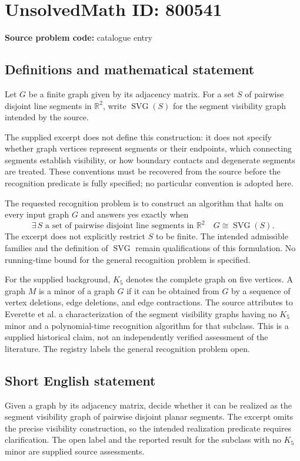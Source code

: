 \documentclass[11pt]{article}
\newcommand{\R}{\mathbb{R}}
\begin{document}
\section*{UnsolvedMath ID: 800541}
\textbf{Source problem code:} catalogue entry
\subsection{Definitions and mathematical statement}
Let \(G\) be a finite graph given by its adjacency matrix. For a set \(S\) of pairwise disjoint line segments in \(\R^2\), write \(\operatorname{SVG}(S)\) for the segment visibility graph intended by the source.

The supplied excerpt does not define this construction: it does not specify whether graph vertices represent segments or their endpoints, which connecting segments establish visibility, or how boundary contacts and degenerate segments are treated. These conventions must be recovered from the source before the recognition predicate is fully specified; no particular convention is adopted here.

The requested recognition problem is to construct an algorithm that halts on every input graph \(G\) and answers yes exactly when
\[
\exists\, S\text{ a set of pairwise disjoint line segments in }\R^2
\quad G\cong\operatorname{SVG}(S).
\]
The excerpt does not explicitly restrict \(S\) to be finite. The intended admissible families and the definition of \(\operatorname{SVG}\) remain qualifications of this formulation. No running-time bound for the general recognition problem is specified.

For the supplied background, \(K_5\) denotes the complete graph on five vertices. A graph \(M\) is a minor of a graph \(G\) if it can be obtained from \(G\) by a sequence of vertex deletions, edge deletions, and edge contractions. The source attributes to Everette et al. a characterization of the segment visibility graphs having no \(K_5\) minor and a polynomial-time recognition algorithm for that subclass. This is a supplied historical claim, not an independently verified assessment of the literature. The registry labels the general recognition problem open.
\subsection{Short English statement}
Given a graph by its adjacency matrix, decide whether it can be realized as the segment visibility graph of pairwise disjoint planar segments. The excerpt omits the precise visibility construction, so the intended realization predicate requires clarification. The open label and the reported result for the subclass with no \(K_5\) minor are supplied source assessments.
\end{document}
